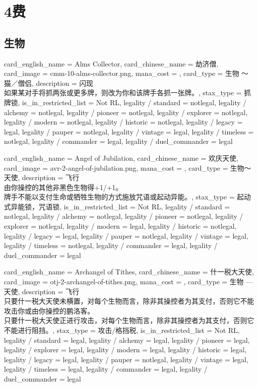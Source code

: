 \documentclass[lang = cn, color = black, 10pt]{AllThatStax}
\begin{document}
\chapter{4费}

\section{生物}

\card
{
	card_english_name = {Alms Collector},
	card_chinese_name = {劫济僧},
	card_image = cmm-10-alms-collector.png,
	mana_cost = ,
	card_type = 生物 ～猫／僧侣,
	description = {闪现\\
		如果某对手将抓两张或更多牌，则改为你和该牌手各抓一张牌。},
	stax_type = 抓牌锁,
	is_in_restricted_list = Not RL,
	legality / standard = notlegal,
	legality / alchemy = notlegal,
	legality / pioneer = notlegal,
	legality / explorer = notlegal,
	legality / modern = notlegal,
	legality / historic = notlegal,
	legality / legacy = legal,
	legality / pauper = notlegal,
	legality / vintage = legal,
	legality / timeless = notlegal,
	legality / commander = legal,
	legality / duel_commander = legal
}

\card
{
	card_english_name = {Angel of Jubilation},
	card_chinese_name = {欢庆天使},
	card_image = avr-2-angel-of-jubilation.png,
	mana_cost = ,
	card_type = 生物～天使,
	description = {飞行\\
		由你操控的其他非黑色生物得+1/+1。\\
		牌手不能以支付生命或牺牲生物的方式施放咒语或起动异能。},
	stax_type = 起动式异能锁，咒语锁,
	is_in_restricted_list = Not RL,
	legality / standard = notlegal,
	legality / alchemy = notlegal,
	legality / pioneer = notlegal,
	legality / explorer = notlegal,
	legality / modern = legal,
	legality / historic = notlegal,
	legality / legacy = legal,
	legality / pauper = notlegal,
	legality / vintage = legal,
	legality / timeless = notlegal,
	legality / commander = legal,
	legality / duel_commander = legal
}

\card
{
	card_english_name = {Archangel of Tithes},
	card_chinese_name = {什一税大天使},
	card_image = otj-2-archangel-of-tithes.png,
	mana_cost = ,
	card_type = 生物 — 天使,
	description = {飞行\\
		只要什一税大天使未横置，对每个生物而言，除非其操控者为其支付，否则它不能攻击你或由你操控的鹏洛客。\\
		只要什一税大天使正进行攻击，对每个生物而言，除非其操控者为其支付，否则它不能进行阻挡。},
	stax_type = 攻击/格挡税,
	is_in_restricted_list = Not RL,
	legality / standard = legal,
	legality / alchemy = legal,
	legality / pioneer = legal,
	legality / explorer = legal,
	legality / modern = legal,
	legality / historic = legal,
	legality / legacy = legal,
	legality / pauper = notlegal,
	legality / vintage = legal,
	legality / timeless = legal,
	legality / commander = legal,
	legality / duel_commander = legal
}
\end{document}
